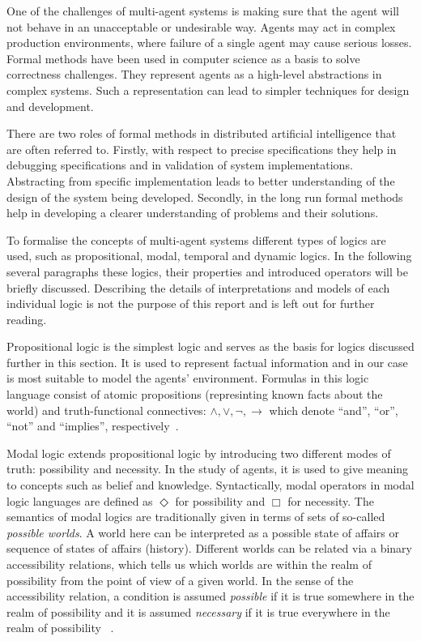 One of the challenges of multi-agent systems is making sure that the agent will not behave in an unacceptable or undesirable way.
Agents may act in complex production environments, where failure of a single agent may cause serious losses.
Formal methods have been used in computer science as a basis to solve correctness challenges.
They represent agents as a high-level abstractions in complex systems.
Such a representation can lead to simpler techniques for design and development.

There are two roles of formal methods in distributed artificial intelligence that are often referred to.
Firstly, with respect to precise specifications they help in debugging specifications and in validation of system implementations.
Abstracting from specific implementation leads to better understanding of the design of the system being developed.
Secondly, in the long run formal methods help in developing a clearer understanding of problems and their solutions. \cite{Singh_99}

To formalise the concepts of multi-agent systems different types of logics are used, such as propositional, modal, temporal and dynamic logics.
In the following several paragraphs these logics, their properties and introduced operators will be briefly discussed.
Describing the details of interpretations and models of each individual logic is not the purpose of this report and is left out for further reading.

Propositional logic is the simplest logic and serves as the basis for logics discussed further in this section.
It is used to represent factual information and in our case is most suitable to model the agents' environment.
Formulas in this logic language consist of atomic propositions (represinting known facts about the world) and truth-functional connectives: $\land,\lor,\neg,\rightarrow$ which denote \enquote{and}, \enquote{or}, \enquote{not} and \enquote{implies}, respectively~\cite{Enderton_72}.

Modal logic extends propositional logic by introducing two different modes of truth: possibility and necessity.
In the study of agents, it is used to give meaning to concepts such as belief and knowledge.
Syntactically, modal operators in modal logic languages are defined as $\Diamond$  for possibility and $\Box$ for necessity.
The semantics of modal logics are traditionally given in terms of sets of so-called \emph{possible worlds}.
A world here can be interpreted as a possible state of affairs or sequence of states of affairs (history).
Different worlds can be related via a binary accessibility relations, which tells us which worlds are within the realm of possibility from the point of view of a given world.
In the sense of the accessibility relation, a condition is assumed \emph{possible} if it is true somewhere in the realm of possibility and it is assumed \emph{necessary} if it is true everywhere in the realm of possibility~ \cite{Saul_63}.

